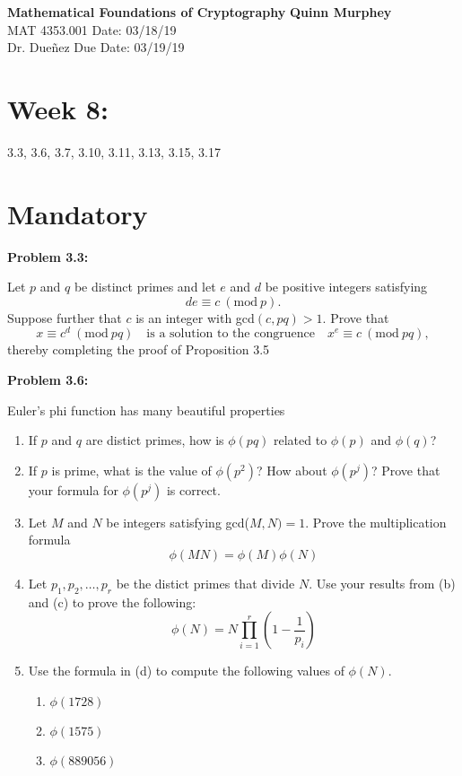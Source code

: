 \documentclass[a4paper, 11pt]{article}
\newcommand{\Mod}[1]{\ (\mathrm{mod}\ #1)}
\begin{document}
\noindent
\large\textbf{Mathematical Foundations of Cryptography} \hfill \textbf{Quinn Murphey} \\
\normalsize MAT 4353.001 \hfill Date: 03/18/19 \\
Dr. Dueñez \hfill Due Date: 03/19/19 \\
\noindent\makebox[\linewidth]{\rule{\paperwidth}{0.4pt}}
\section*{Week 8:}
    3.3, 3.6, 3.7, 3.10, 3.11, 3.13, 3.15, 3.17
    
\section*{Mandatory}

\textbf{Problem 3.3:}
    
    Let $p$ and $q$ be distinct primes and let $e$ and $d$ be positive integers satisfying $$de \equiv c \Mod{p}.$$ Suppose further that $c$ is an integer with gcd$(c,pq)>1$. Prove that $$x\equiv c^d \Mod{pq}\quad \text{is a solution to the congruence} \quad x^e \equiv c \Mod{pq},$$ thereby completing the proof of Proposition 3.5
    
    
    
\noindent\textbf{Problem 3.6:}
    
    Euler's phi function has many beautiful properties
    \begin{enumerate}[label=(\alph*)]
        \item If $p$ and $q$ are distict primes, how is $\phi(pq)$ related to $\phi(p)$ and $\phi(q)$?
        \item If $p$ is prime, what is the value of $\phi(p^2)$? How about $\phi(p^j)$? Prove that your formula for $\phi(p^j)$ is correct.
        \item Let $M$ and $N$ be integers satisfying gcd($M,N)=1$. Prove the multiplication formula $$\phi(MN)=\phi(M)\phi(N)$$
        \item Let $p_1,p_2,\dots,p_r$ be the distict primes that divide $N$. Use your results from (b) and (c) to prove the following: $$\phi(N) = N\prod_{i=1}^{r} \left(1-\frac{1}{p_i}\right)$$
        \item Use the formula in (d) to compute the following values of $\phi(N).$
        \begin{enumerate}[label=(\roman*)]
            \item $\phi(1728)$
            \item $\phi(1575)$
            \item $\phi(889056)$
        \end{enumerate}
    \end{enumerate}
    
\end{document}
